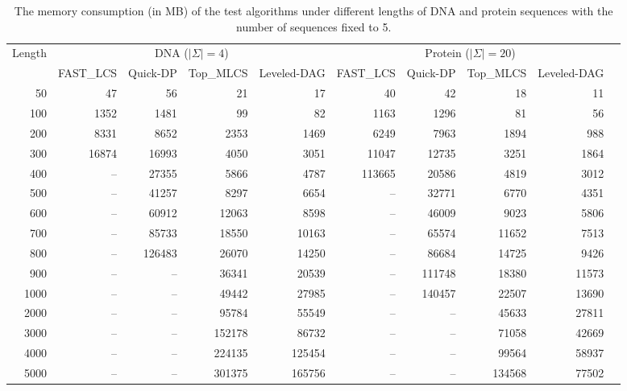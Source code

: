 \documentclass[utf8]{frontiersSCNS} %
\begin{document}
\begin{table*}[htp]
  \footnotesize
  \caption{The memory consumption (in MB) of the test algorithms under
    different lengths of DNA and protein sequences with the number of
    sequences fixed to 5.}
  \label{tab:memory2}
  \begin{tabular}{|r|r|r|r|r|r|r|r|r|r|}
     \hline
    Length &
    \multicolumn{4}{c|}{DNA ($|\Sigma|=4$)} & \multicolumn{4}{c|}{Protein ($|\Sigma|=20$)}\\
    \cline{2-9}
     & FAST\_LCS & Quick-DP & Top\_MLCS & Leveled-DAG & FAST\_LCS & Quick-DP & Top\_MLCS & Leveled-DAG \\
    \hline
    50   & 47     & 56      & 21      & 17      & 40      & 42       & 18     & 11     \\
    100  & 1352   & 1481    & 99      & 82      & 1163    & 1296     & 81     & 56     \\
    200  & 8331   & 8652    & 2353    & 1469    & 6249    & 7963     & 1894   & 988   \\
    300  & 16874  & 16993   & 4050    & 3051    & 11047   & 12735    & 3251   & 1864  \\
    400  & --     & 27355   & 5866    & 4787    & 113665  & 20586    & 4819   & 3012  \\
    500  & --     & 41257   & 8297    & 6654    & --      & 32771    & 6770   & 4351   \\
    600  & --     & 60912   & 12063   & 8598    & --      & 46009    & 9023   & 5806   \\
    700  & --     & 85733   & 18550   & 10163   & --      & 65574    & 11652  & 7513   \\
    800  & --     & 126483  & 26070   & 14250   & --      & 86684    & 14725  & 9426   \\
    900  & --     & --      & 36341   & 20539   & --      & 111748   & 18380  & 11573  \\

    1000 & --     & --      & 49442   & 27985   & --      & 140457   & 22507  & 13690  \\
    2000 & --     & --      & 95784   & 55549   & --      & --       & 45633  & 27811  \\
    3000 & --     & --      & 152178  & 86732   & --      & --       & 71058  & 42669  \\
    4000 & --     & --      & 224135  & 125454  & --      & --       & 99564  & 58937 \\
    5000 & --     & --      & 301375  & 165756  & --      & --       & 134568 & 77502 \\
    \hline
  \end{tabular}
\end{table*}
\end{document}

